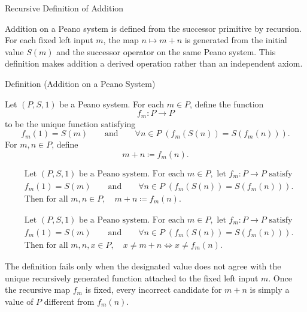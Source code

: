 \begin{topicbox}{Recursive Definition of Addition}
\begin{exposition}
Addition on a Peano system is defined from the successor primitive by
recursion. For each fixed left input $m$, the map $n \mapsto m+n$ is generated
from the initial value $S(m)$ and the successor operator on the same Peano
system. This definition makes addition a derived operation rather than an
independent axiom.
\end{exposition}

\begin{definitionbox}{Definition (Addition on a Peano System)}
\begin{definition}
\label{def:addition-on-peano-system}
Let $(P,S,1)$ be a Peano system. For each $m \in P$, define the function
\[
f_m : P \to P
\]
to be the unique function satisfying
\[
f_m(1)=S(m)
\qquad\text{and}\qquad
\forall n \in P\;(f_m(S(n))=S(f_m(n))).
\]
For $m,n \in P$, define
\[
m+n \coloneqq f_m(n).
\]
\end{definition}
\end{definitionbox}

\begin{remark*}
\[
\begin{aligned}
&\text{Let } (P,S,1) \text{ be a Peano system. For each } m \in P,
\text{ let } f_m : P \to P \text{ satisfy}\\
&f_m(1)=S(m)
\qquad\text{and}\qquad
\forall n \in P\;(f_m(S(n))=S(f_m(n))).\\
&\text{Then for all } m,n \in P,\quad m+n \coloneqq f_m(n).
\end{aligned}
\]
\end{remark*}

\begin{remark*}
\[
\begin{aligned}
&\text{Let } (P,S,1) \text{ be a Peano system. For each } m \in P,
\text{ let } f_m : P \to P \text{ satisfy}\\
&f_m(1)=S(m)
\qquad\text{and}\qquad
\forall n \in P\;(f_m(S(n))=S(f_m(n))).\\
&\text{Then for all } m,n,x \in P,\quad x \neq m+n
\Longleftrightarrow
x \neq f_m(n).
\end{aligned}
\]
\end{remark*}

\begin{remark*}
The definition fails only when the designated value does not agree with the
unique recursively generated function attached to the fixed left input $m$.
Once the recursive map $f_m$ is fixed, every incorrect candidate for $m+n$ is
simply a value of $P$ different from $f_m(n)$.
\end{remark*}


\end{topicbox}
